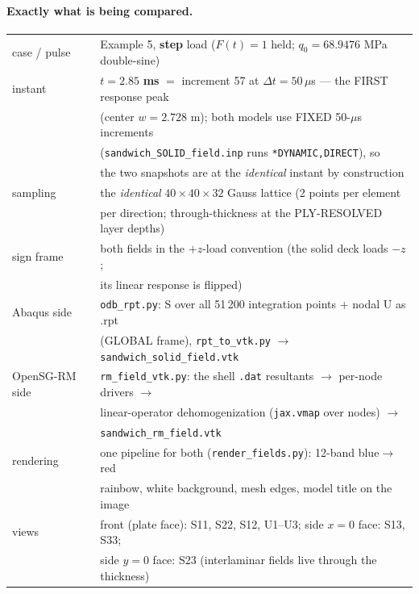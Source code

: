 \documentclass[11pt]{article}
\newcommand{\code}[1]{\texttt{#1}}
\begin{document}
\paragraph{Exactly what is being compared.}
\begin{center}\begin{tabular}{ll}\toprule
case / pulse & Example 5, \textbf{step} load ($F(t)=1$ held; $q_0 =
68.9476$ MPa double-sine)\\
instant & $t = \mathbf{2.85}$ \textbf{ms} $=$ increment 57 at $\Delta t =
50\,\mu$s --- the FIRST response peak\\
 & (center $w = 2.728$ m); both models use FIXED 50-$\mu$s increments\\
 & (\code{sandwich\_SOLID\_field.inp} runs \code{*DYNAMIC,DIRECT}), so\\
 & the two snapshots are at the \emph{identical} instant by construction\\
sampling & the \emph{identical} $40{\times}40{\times}32$ Gauss lattice
(2 points per element\\
 & per direction; through-thickness at the PLY-RESOLVED layer depths)\\
sign frame & both fields in the $+z$-load convention (the solid deck loads
$-z$;\\
 & its linear response is flipped)\\
Abaqus side & \code{odb\_rpt.py}: S over all 51\,200 integration points +
nodal U as .rpt\\
 & (GLOBAL frame), \code{rpt\_to\_vtk.py} $\to$
\code{sandwich\_solid\_field.vtk}\\
OpenSG-RM side & \code{rm\_field\_vtk.py}: the shell \code{.dat} resultants
$\to$ per-node drivers $\to$\\
 & linear-operator dehomogenization (\code{jax.vmap} over nodes) $\to$\\
 & \code{sandwich\_rm\_field.vtk}\\
rendering & one pipeline for both (\code{render\_fields.py}): 12-band
blue$\to$red\\
 & rainbow, white background, mesh edges, model title on the image\\
views & front (plate face): S11, S22, S12, U1--U3; side $x{=}0$ face:
S13, S33;\\
 & side $y{=}0$ face: S23 (interlaminar fields live through the
thickness)\\
\bottomrule\end{tabular}\end{center}
\end{document}
